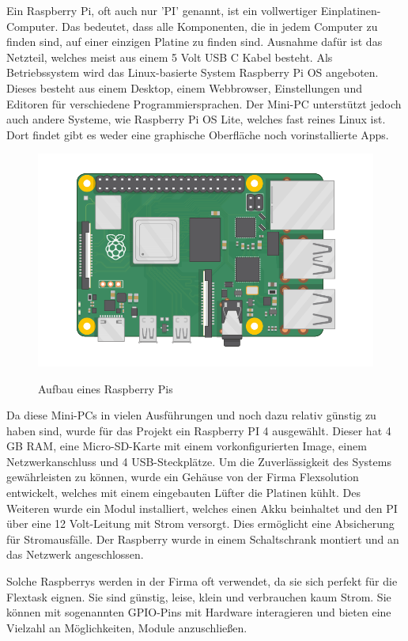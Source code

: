 Ein Raspberry Pi, oft auch nur 'PI' genannt, ist ein vollwertiger Einplatinen-Computer. Das bedeutet, dass alle Komponenten, die in jedem Computer zu finden sind, auf einer einzigen Platine zu finden sind. Ausnahme dafür ist das Netzteil, welches meist aus einem 5 Volt USB C Kabel besteht. Als Betriebssystem wird das Linux-basierte System Raspberry Pi OS angeboten. Dieses besteht aus einem Desktop, einem Webbrowser, Einstellungen und Editoren für verschiedene Programmiersprachen. Der Mini-PC unterstützt jedoch auch andere Systeme, wie Raspberry Pi OS Lite, welches fast reines Linux ist. Dort findet gibt es weder eine graphische Oberfläche noch vorinstallierte Apps.

\begin{figure}[h t]
  \centering
  \includegraphics[scale=0.5]{pics/raspberry-pi.png}
  \caption{Aufbau eines Raspberry Pis}
  \label{fig:impl:RaspiAufbau}
  \cite{raspyimage}
\end{figure}



Da diese Mini-PCs in vielen Ausführungen und noch dazu relativ günstig zu haben sind, wurde für das Projekt ein Raspberry PI 4 ausgewählt. Dieser hat 4 GB RAM, eine Micro-SD-Karte mit einem vorkonfigurierten Image, einem Netzwerkanschluss und 4 USB-Steckplätze. Um die Zuverlässigkeit des Systems gewährleisten zu können, wurde ein Gehäuse von der Firma Flexsolution entwickelt, welches mit einem eingebauten Lüfter die Platinen kühlt. Des Weiteren wurde ein Modul installiert, welches einen Akku beinhaltet und den PI über eine 12 Volt-Leitung mit Strom versorgt. Dies ermöglicht eine Absicherung für Stromausfälle. Der Raspberry wurde in einem Schaltschrank montiert und an das Netzwerk angeschlossen.



Solche Raspberrys werden in der Firma oft verwendet, da sie sich perfekt für die Flextask eignen. Sie sind günstig, leise, klein und verbrauchen kaum Strom. Sie können mit sogenannten GPIO-Pins mit Hardware interagieren und bieten eine Vielzahl an Möglichkeiten, Module anzuschließen.

\cite{aboutRaspberry}
\cite{raspberryChip}